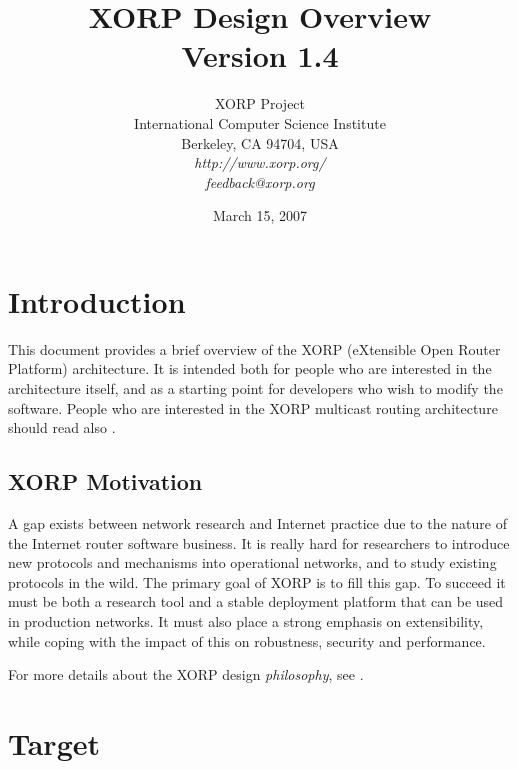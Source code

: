 \documentclass[11pt]{article}
\begin{document}
\title{XORP Design Overview \\
\vspace{1ex}
Version 1.4}
\author{ XORP Project					\\
	 International Computer Science Institute	\\
	 Berkeley, CA 94704, USA			\\
         {\it http://www.xorp.org/}			\\
	 {\it feedback@xorp.org}
}
\date{March 15, 2007}

\maketitle


\section{Introduction}

This document provides a brief overview of the XORP (eXtensible Open
Router Platform) architecture. It is intended both for people who are
interested in the architecture itself, and as a starting point for developers
who wish to modify the software.  People who are interested in the XORP
multicast routing architecture should read also
\cite{xorp:multicast_arch}.

\subsection{XORP Motivation}

A gap exists between network research and Internet practice due to the
nature of the Internet router software business.  It is really hard
for researchers to introduce new protocols and mechanisms into
operational networks, and to study existing protocols in the wild.
The primary goal of XORP is to fill this gap.  To succeed it must be both
a research tool and a stable deployment platform that can be used in
production networks.  It must also place a strong emphasis on
extensibility, while coping with the impact of this on robustness,
security and performance.

For more details about the XORP design {\it philosophy}, see
\cite{handley:hotnets2002:xorp}.

\section{Target}
\end{document}
